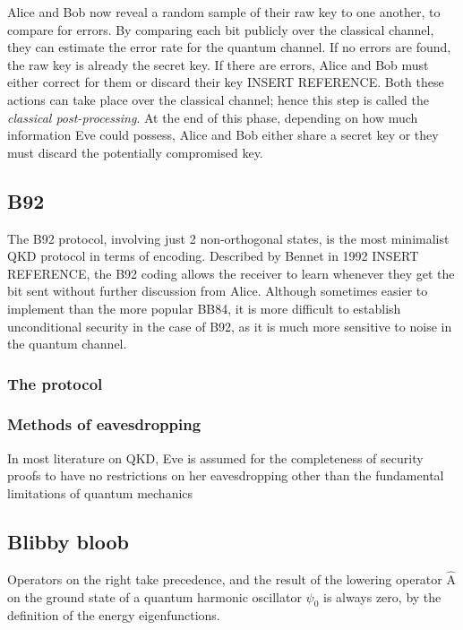 \documentclass[paper=a4, fontsize=11pt]{scrartcl} %
\numberwithin{equation}{section} %
\numberwithin{figure}{section} %
\numberwithin{table}{section} %
\begin{document}
Alice and Bob now reveal a random sample of their raw key to one another, to compare for errors. By
comparing each bit publicly over the classical channel, they can estimate the error rate for
the quantum channel. If no errors are found, the raw key is already the secret key. If there are
errors, Alice and Bob must either correct for them or discard their key INSERT REFERENCE. Both these actions can
take place over the classical channel; hence this step is called the \textit{classical post-processing}.
At the end of this phase, depending on how much information Eve could possess, Alice and Bob either share
a secret key or they must discard the potentially compromised key.

\subsection{B92}
The B92 protocol, involving just 2 non-orthogonal states, is the most minimalist QKD protocol in terms
of encoding. Described by Bennet in 1992 INSERT REFERENCE, the B92 coding allows the receiver to learn
whenever they get the bit sent without further discussion from Alice. Although sometimes easier to implement
than the more popular BB84, it is more difficult to establish unconditional security in the case of B92,
as it is much more sensitive to noise in the quantum channel.

\subsubsection{The protocol}


\subsubsection{Methods of eavesdropping}
In most literature on QKD, Eve is assumed for the completeness of security proofs to have no restrictions
on her eavesdropping other than the fundamental limitations of quantum mechanics





















\subsection{Blibby bloob}
Operators on the right take precedence, and the result of the lowering operator $\hat{\textrm{A}}$ on the ground state of a quantum harmonic oscillator $\psi_0$ is always zero, by the definition of the energy eigenfunctions.
\end{document}
